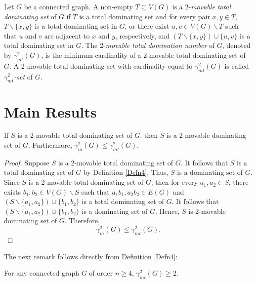 \documentclass[twoside,12pt]{article}
\begin{document}
\begin{definition}\label{Defn4}
	\cite{p} Let $G$ be a connected graph. A non-empty $T\subseteq V(G)$ is a $2$-\textit{movable total dominating set} of $G$ if $T$ is a total dominating set and for every pair $x,y \in T$, $T \backslash \{x, y\}$ is a total dominating set in $G$, or there exist $u, v \in V(G) \backslash T$ such that $u$ and $v$ are adjacent to $x$ and $y$, respectively, and $(T \backslash \{x,y\}) \cup \{u,v\}$ is a total dominating set in $G$. The $2$-\textit{movable total domination number} of $G$, denoted by $\gamma_{mt}^{2}(G)$, is the minimum cardinality of a 2-movable total dominating set of $G$. A 2-movable total dominating set with cardinality equal to $\gamma_{mt}^{2}(G)$ is called \textit{$\gamma_{mt}^{2}$-set} of $G$.
\end{definition}

\section{Main Results}

\begin{theorem}
	If $S$ is a 2-movable total dominating set of $G$, then $S$ is a 2-movable dominating set of $G$. Furthermore, $\gamma_{m}^2(G) \leq \gamma_{mt}^2(G)$.
\end{theorem}\vspace{0.2mm}

\begin{proof}
	Suppose $S$ is a 2-movable total dominating set of $G$. It follows that $S$ is a total dominating set of $G$ by Definition \ref{Defn4}. Thus, $S$ is a dominating set of $G$. Since $S$ is a 2-movable total dominating set of $G$, then for every $a_1, a_2 \in S$, there exists $b_1, b_2 \in V(G) \backslash S$ such that $a_1b_1, a_2b_2 \in E(G)$ and $(S \backslash \{a_1, a_2\}) \cup \{b_1, b_2\}$ is a total dominating set of $G$. It follows that $(S \backslash \{a_1, a_2\}) \cup \{b_1, b_2\}$ is a dominating set of $G$. Hence, $S$ is 2-movable dominating set of $G$. Therefore, $$\gamma_{m}^2(G) \leq \gamma_{mt}^2(G).$$
\end{proof}

The next remark follows directly from Definition \ref{Defn4}:
\begin{remark}\label{Rmk:12}
	For any connected graph $G$ of order $n \geq 4$, $\gamma_{mt}^2(G) \geq 2$.
\end{remark}

\end{document}
